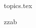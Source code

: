 \documentclass{exam}
\begin{document}
     {topics.tex}


\begin{questions}

                 \printanswers




              \question  zzab



\end{questions}
\end{document}

